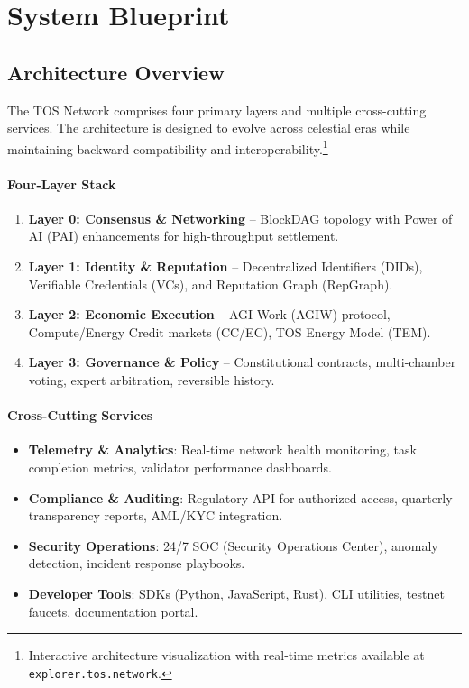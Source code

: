 \documentclass[11pt]{article}
\begin{document}
\section{System Blueprint}
\subsection{Architecture Overview}
The TOS Network comprises four primary layers and multiple cross-cutting services. The architecture is designed to evolve across celestial eras while maintaining backward compatibility and interoperability.\footnote{Interactive architecture visualization with real-time metrics available at \texttt{explorer.tos.network}.}

\paragraph{Four-Layer Stack}
\begin{enumerate}[noitemsep]
  \item \textbf{Layer 0: Consensus \& Networking} -- BlockDAG topology with Power of AI (PAI) enhancements for high-throughput settlement.
  \item \textbf{Layer 1: Identity \& Reputation} -- Decentralized Identifiers (DIDs), Verifiable Credentials (VCs), and Reputation Graph (RepGraph).
  \item \textbf{Layer 2: Economic Execution} -- AGI Work (AGIW) protocol, Compute/Energy Credit markets (CC/EC), TOS Energy Model (TEM).
  \item \textbf{Layer 3: Governance \& Policy} -- Constitutional contracts, multi-chamber voting, expert arbitration, reversible history.
\end{enumerate}

\paragraph{Cross-Cutting Services}
\begin{itemize}[noitemsep]
  \item \textbf{Telemetry \& Analytics}: Real-time network health monitoring, task completion metrics, validator performance dashboards.
  \item \textbf{Compliance \& Auditing}: Regulatory API for authorized access, quarterly transparency reports, AML/KYC integration.
  \item \textbf{Security Operations}: 24/7 SOC (Security Operations Center), anomaly detection, incident response playbooks.
  \item \textbf{Developer Tools}: SDKs (Python, JavaScript, Rust), CLI utilities, testnet faucets, documentation portal.
\end{itemize}
\end{document}
